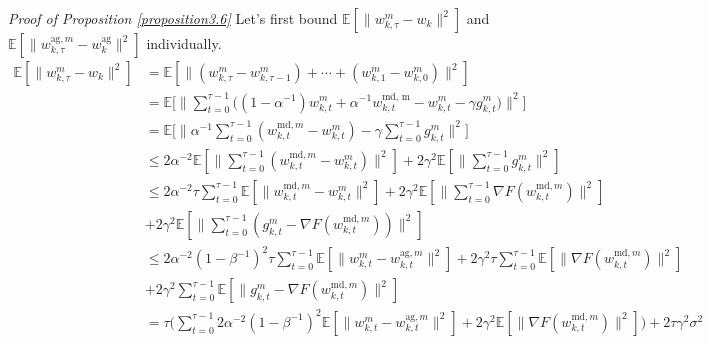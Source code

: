 \emph{Proof of Proposition \ref{proposition3.6}} \textrm{ } Let's first bound $\mathbb{E}[\|w_{k, \tau}^m - w_k\|^2]$ and $\mathbb{E}[\|w_{k, \tau}^{\textrm{ag}, m} - w_k^{\textrm{ag}}\|^2]$ individually.
\begin{align*}
    \mathbb{E}[\|w_{k, \tau}^m - w_k\|^2] &= \mathbb{E}[\|(w_{k, \tau}^m-w_{k, \tau-1}^m) +\cdots+ (w_{k, 1}^m - w_{k, 0}^m)\|^2] \\
    &= \mathbb{E}\Big[\Big\|\sum_{t=0}^{\tau-1}\Big((1-\alpha^{-1})w_{k, t}^m+\alpha^{-1}w_{k, t}^{\textrm{md, m}}-w_{k, t}^m-\gamma g_{k, t}^m\Big)\Big\|^2\Big] \\
    &= \mathbb{E}\Big[\Big\|\alpha^{-1}\sum_{t=0}^{\tau-1}(w_{k, t}^{\textrm{md}, m}-w_{k, t}^m) - \gamma\sum_{t=0}^{\tau-1}g_{k, t}^m\Big\|^2\Big] \\
    &\leq 2\alpha^{-2}\mathbb{E}[\|\sum_{t=0}^{\tau-1}(w_{k, t}^{\textrm{md}, m}-w_{k, t}^m)\|^2] + 2\gamma^2\mathbb{E}[\|\sum_{t=0}^{\tau-1}g_{k, t}^m\|^2]\\
    &\leq 2\alpha^{-2}\tau\sum_{t=0}^{\tau-1}\mathbb{E}[\|w_{k, t}^{\textrm{md}, m}-w_{k, t}^m\|^2] + 2\gamma^2\mathbb{E}[\|\sum_{t=0}^{\tau-1}\nabla F(w_{k, t}^{\textrm{md}, m})\|^2] \\
    &+ 2\gamma^2\mathbb{E}[\|\sum_{t=0}^{\tau-1}(g_{k, t}^m - \nabla F(w_{k, t}^{\textrm{md}, m}))\|^2]\\
    &\leq 2\alpha^{-2}(1-\beta^{-1})^2\tau\sum_{t=0}^{\tau-1}\mathbb{E}[\|w_{k, t}^m-w_{k, t}^{\textrm{ag}, m}\|^2] + 2\gamma^2\tau\sum_{t=0}^{\tau-1}\mathbb{E}[\|\nabla F(w_{k, t}^{\textrm{md}, m})\|^2]\\
    &+ 2\gamma^2\sum_{t=0}^{\tau-1}\mathbb{E}[\|g_{k, t}^m - \nabla F(w_{k, t}^{\textrm{md}, m})\|^2]\\
    &= \tau \Big(\sum_{t=0}^{\tau-1} 2\alpha^{-2}(1-\beta^{-1})^2\mathbb{E}[\|w_{k, t}^m- w_{k, t}^{\textrm{ag}, m}\|^2 ] + 2\gamma^2\mathbb{E}[\|\nabla F(w_{k, t}^{\textrm{md}, m})\|^2]\Big) +2\tau\gamma^2\sigma^2
\end{align*}
